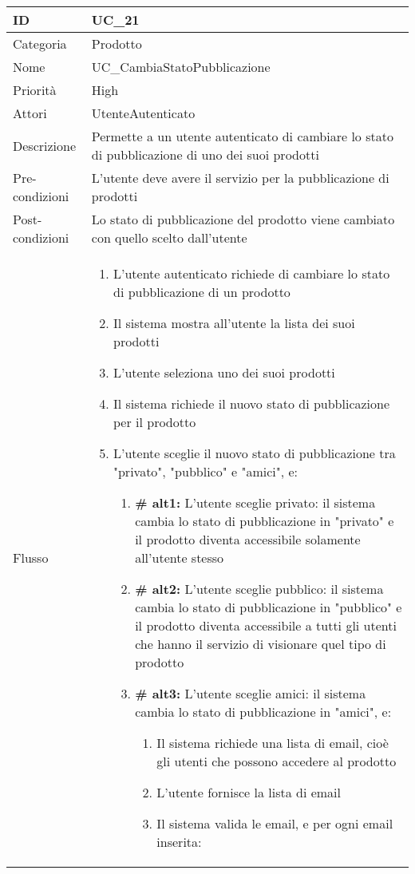\begin{center}
\begin{tabular}{ |p{2cm}|p{13cm}|  }
\hline
ID & UC\_21\\\hline
Categoria & Prodotto \\\hline
Nome & UC\_CambiaStatoPubblicazione \\\hline
Priorità & High \\\hline
Attori &  UtenteAutenticato \\\hline
Descrizione & Permette a un utente autenticato di cambiare lo stato di pubblicazione di uno dei suoi prodotti\\\hline
Pre-condizioni &  L'utente deve avere il servizio per la pubblicazione di prodotti\\\hline
Post-condizioni &  Lo stato di pubblicazione del prodotto viene cambiato con quello scelto dall'utente\\\hline
Flusso &  	\begin{enumerate}
			\item L'utente autenticato richiede di cambiare lo stato di pubblicazione di un prodotto
			\item Il sistema mostra all'utente la lista dei suoi prodotti
			\item L'utente seleziona uno dei suoi prodotti
			\item Il sistema richiede il nuovo stato di pubblicazione per il prodotto
			\item L'utente sceglie il nuovo stato di pubblicazione tra "privato", "pubblico" e "amici", e:
				\begin{enumerate}[  ]
					\item \textbf{\# alt1:} L'utente sceglie privato: il sistema cambia lo stato di pubblicazione in "privato" e il prodotto diventa accessibile solamente all'utente stesso
					\item \textbf{\# alt2:} L'utente sceglie pubblico: il sistema cambia lo stato di pubblicazione in "pubblico" e il prodotto diventa accessibile a tutti gli utenti che hanno il servizio di visionare quel tipo di prodotto
					\item \textbf{\# alt3:} L'utente sceglie amici: il sistema cambia lo stato di pubblicazione in "amici", e:
					\begin{enumerate}[label*=\arabic*.]
						\item Il sistema richiede una lista di email, cioè gli utenti che possono accedere al prodotto
						\item L'utente fornisce la lista di email
						\item Il sistema valida le email, e per ogni email inserita:

\end{enumerate}
\end{enumerate}
\end{enumerate}
\end{tabular}
\end{center}
